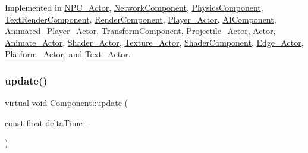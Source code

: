 Implemented in \hyperlink{classNPC__Actor_ab274d0517bd0cd710efc7df31cd7450b}{N\+P\+C\+\_\+\+Actor}, \hyperlink{classNetworkComponent_a3361f9b02b8b5c0bed3beb4d70c28bdb}{Network\+Component}, \hyperlink{classPhysicsComponent_a5a5e472f0c6975d4a22e0990c504ec0a}{Physics\+Component}, \hyperlink{classTextRenderComponent_a097fb07ecd0e1feed1c4c2bd7c97d480}{Text\+Render\+Component}, \hyperlink{classRenderComponent_a2d05ddd16edf5d2022d46a640a74a4da}{Render\+Component}, \hyperlink{classPlayer__Actor_a200b6b956d9c597cbc626ca9bcafb25e}{Player\+\_\+\+Actor}, \hyperlink{classAIComponent_a82e8e79810024e09695545ebf59452f2}{A\+I\+Component}, \hyperlink{classAnimated__Player__Actor_ac6c4259340bfa000195b69f7eef1ae17}{Animated\+\_\+\+Player\+\_\+\+Actor}, \hyperlink{classTransformComponent_aab0dd130a6c8d4d6f873f81e59e48ee0}{Transform\+Component}, \hyperlink{classProjectile__Actor_a58d01ff77f0815ca611236f139b7aafa}{Projectile\+\_\+\+Actor}, \hyperlink{classActor_a47101d6275509662bf6c84c3f3439696}{Actor}, \hyperlink{classAnimate__Actor_ae67ff6399f3d46696f84c77b2e519ead}{Animate\+\_\+\+Actor}, \hyperlink{classShader__Actor_a16f7f5f30d3f3cd125de9713457a7db2}{Shader\+\_\+\+Actor}, \hyperlink{classTexture__Actor_ac9677f60df27e14ef3550ae2b0678ad5}{Texture\+\_\+\+Actor}, \hyperlink{classShaderComponent_a7ebd7c8ee1b2aea5ad2010a4652bb588}{Shader\+Component}, \hyperlink{classEdge__Actor_ae7a429d48b86442154c93eb65bc8b22d}{Edge\+\_\+\+Actor}, \hyperlink{classPlatform__Actor_a34b915aa583cdf659ec29368b6feb7e8}{Platform\+\_\+\+Actor}, and \hyperlink{classText__Actor_af9b25da889aad4aec6f17671c37ac431}{Text\+\_\+\+Actor}.

\mbox{\label{classComponent_a3448977e6f464df89e77dda7c6f52204}} 
\subsubsection{\texorpdfstring{update()}{update()}\hspace{0.1cm}{\footnotesize\ttfamily [1/2]}}
{\footnotesize\ttfamily virtual \hyperlink{imgui__impl__opengl3__loader_8h_ac668e7cffd9e2e9cfee428b9b2f34fa7}{void} Component\+::update (\begin{DoxyParamCaption}\item[{const float}]{delta\+Time\+\_\+ }\end{DoxyParamCaption})\hspace{0.3cm}{\ttfamily [pure virtual]}}




